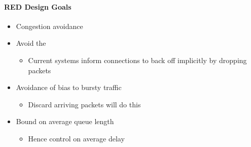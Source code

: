 \paragraph{RED Design Goals}\label{par:Random_Early_Discard_Design_Goals}
\begin{itemize}[noitemsep]
\item Congestion avoidance
\item Avoid the 
  \begin{itemize}[noitemsep]
  \item Current systems inform connections to back off implicitly by dropping packets
\end{itemize}

\item Avoidance of bias to bursty traffic
  \begin{itemize}[noitemsep]
  \item Discard arriving packets will do this
  \end{itemize}

\item Bound on average queue length
  \begin{itemize}[noitemsep]
  \item Hence control on average delay
  \end{itemize}
\end{itemize}

